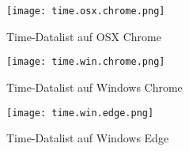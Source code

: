 \begin{figure}[!htb]
    \centering
    \begin{minipage}[b]{0.28\textwidth}
        \centering
        \texttt{[image: time.osx.chrome.png]}
        \caption{\centering Time-Datalist auf OSX Chrome}
        \label{img:timeOsxChromeDatalist}
    \end{minipage}
    \hfill
    \begin{minipage}[b]{0.28\textwidth}
        \centering
        \texttt{[image: time.win.chrome.png]}
        \caption{\centering Time-Datalist auf Windows Chrome}
        \label{img:timeWinChromeDatalist}
    \end{minipage}
    \hfill
    \begin{minipage}[b]{0.28\textwidth}
        \centering
        \texttt{[image: time.win.edge.png]}
        \caption{\centering Time-Datalist auf Windows Edge}
        \label{img:timeWinEdgeDatalist}
    \end{minipage}
\end{figure}
